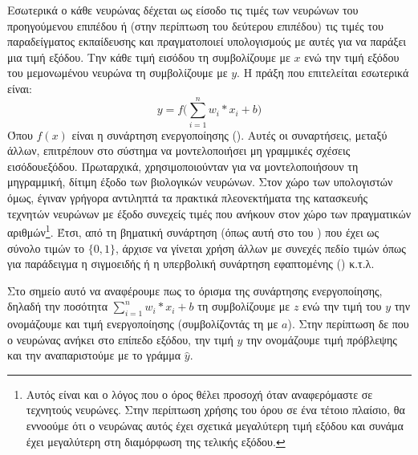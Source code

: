 Εσωτερικά ο κάθε νευρώνας δέχεται ως είσοδο τις τιμές των νευρώνων του προηγούμενου επιπέδου ή (στην περίπτωση του δεύτερου επιπέδου) τις τιμές του παραδείγματος εκπαίδευσης και πραγματοποιεί υπολογισμούς με αυτές για να παράξει μια τιμή εξόδου. Την κάθε τιμή εισόδου τη συμβολίζουμε με $x$ ενώ την τιμή εξόδου του μεμονωμένου νευρώνα τη συμβολίζουμε με $y$. Η πράξη που επιτελείται εσωτερικά είναι:
\begin{equation}
y = f\Big(\sum_{i = 1}^{n} w_i \ast x_i  +  b\Big)
\end{equation}
Όπου $f(x)$ είναι η συνάρτηση ενεργοποίησης (). Αυτές οι συναρτήσεις, μεταξύ άλλων, επιτρέπουν στο σύστημα να μοντελοποιήσει μη γραμμικές σχέσεις εισόδου\textendash εξόδου. Πρωταρχικά, χρησιμοποιούνταν για να μοντελοποιήσουν τη μη\textendash γραμμική, δίτιμη έξοδο των βιολογικών νευρώνων. Στον χώρο των υπολογιστών όμως, έγιναν γρήγορα αντιληπτά τα πρακτικά πλεονεκτήματα της κατασκευής τεχνητών νευρώνων με έξοδο συνεχείς τιμές που ανήκουν στον χώρο των πραγματικών αριθμών\footnote{Αυτός είναι και ο λόγος που ο όρος  θέλει προσοχή όταν αναφερόμαστε σε τεχνητούς νευρώνες. Στην περίπτωση χρήσης του όρου σε ένα τέτοιο πλαίσιο, θα εννοούμε ότι ο νευρώνας αυτός έχει σχετικά μεγαλύτερη τιμή εξόδου και συνάμα έχει μεγαλύτερη  στη διαμόρφωση της τελικής εξόδου.}. Έτσι, από τη βηματική συνάρτηση (όπως αυτή στο  του  \cite{rosenblatt1958perceptron}) που έχει ως σύνολο τιμών το $\{0,1\}$, άρχισε να γίνεται χρήση άλλων με συνεχές πεδίο τιμών όπως για παράδειγμα η σιγμοειδής ή η υπερβολική συνάρτηση εφαπτομένης () κ.τ.λ. \par

Στο σημείο αυτό να αναφέρουμε πως το όρισμα της συνάρτησης ενεργοποίησης, δηλαδή την ποσότητα \(\sum_{i = 1}^{n} w_i \ast x_i  +  b\) τη συμβολίζουμε με $z$ ενώ την τιμή του $y$ την ονομάζουμε και τιμή ενεργοποίησης (συμβολίζοντάς τη με $a$). Στην περίπτωση δε που ο νευρώνας ανήκει στο επίπεδο εξόδου, την τιμή $y$ την ονομάζουμε τιμή πρόβλεψης και την αναπαριστούμε με το γράμμα $\hat{y}$. \par

